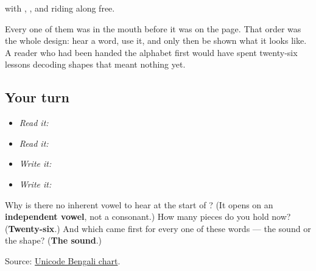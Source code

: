 with \textbf{}, \textbf{}, \textbf{} and \textbf{} riding along free.

Every one of them was in the mouth before it was on the page. That order was the whole design: hear a word, use it, and only then be shown what it looks like. A reader who had been handed the alphabet first would have spent twenty-six lessons decoding shapes that meant nothing yet.

\subsection*{Your turn}
\begin{itemize}
\raggedright
  \item \emph{Read it:}      
  \item \emph{Read it:}  
  \item \emph{Write it:} 
  \item \emph{Write it:}  
\end{itemize}

\begin{tcolorbox}[breakable,colback=teal!4,colframe=teal!35!black,title={Before you move on}]
Why is there no inherent vowel to hear at the start of \textbf{}? (It opens on an \textbf{independent vowel}, not a consonant.) How many pieces do you hold now? (\textbf{Twenty-six}.) And which came first for every one of these words — the sound or the shape? (\textbf{The sound}.)

Source: \href{https://www.unicode.org/charts/PDF/U0980.pdf}{Unicode Bengali chart}.
\end{tcolorbox}
